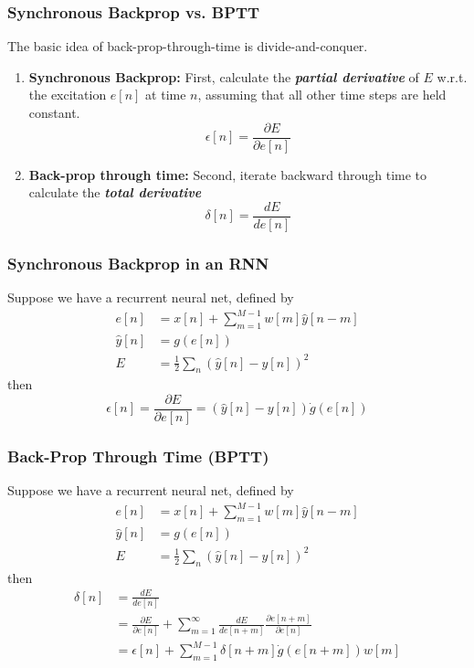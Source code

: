 \documentclass{beamer}
\begin{document}
\begin{frame}
  \frametitle{Synchronous Backprop vs. BPTT}

  The basic idea of back-prop-through-time is divide-and-conquer.
  \begin{enumerate}
    \item {\bf Synchronous Backprop:} First, calculate the {\bf\em
      partial derivative} of $E$ w.r.t. the excitation $e[n]$ at time
      $n$, assuming that all other time steps are held constant.
      \[
      \epsilon[n] = \frac{\partial E}{\partial e[n]}
      \]
    \item {\bf Back-prop through time:} Second, iterate backward
      through time to calculate the {\bf\em total derivative}
      \[
      \delta[n] = \frac{dE}{d e[n]}
      \]
  \end{enumerate}
\end{frame}

\begin{frame}
  \frametitle{Synchronous Backprop in an RNN}
  Suppose we have a recurrent neural net, defined by
  \begin{align*}
    e[n] &= x[n] + \sum_{m=1}^{M-1}w[m] \hat{y}[n-m]\\
    \hat{y}[n] &= g\left(e[n]\right)\\
    E &= \frac{1}{2}\sum_n\left(\hat{y}[n]-y[n]\right)^2
  \end{align*}
  then
  \[
  \epsilon[n]=\frac{\partial E}{\partial e[n]} = \left(\hat{y}[n]-y[n]\right) \dot{g}(e[n])
  \]
\end{frame}
  
\begin{frame}
  \frametitle{Back-Prop Through Time (BPTT)}
  Suppose we have a recurrent neural net, defined by
  \begin{align*}
    e[n] &= x[n] + \sum_{m=1}^{M-1}w[m] \hat{y}[n-m]\\
    \hat{y}[n] &= g\left(e[n]\right)\\
    E &= \frac{1}{2}\sum_n\left(\hat{y}[n]-y[n]\right)^2
  \end{align*}
  then
  \begin{align*}
    \delta[n]&=\frac{dE}{de[n]}\\
    &=\frac{\partial E}{\partial e[n]}+
    \sum_{m=1}^{\infty}\frac{dE}{de[n+m]}\frac{\partial e[n+m]}{\partial e[n]}\\
    &=\epsilon[n]+\sum_{m=1}^{M-1}\delta[n+m]\dot{g}(e[n+m])w[m]
  \end{align*}
\end{frame}
  
\end{document}
